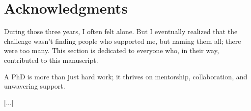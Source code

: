 \chapter*{Acknowledgments}
%


During those three years, I often felt alone.
But I eventually realized that the challenge wasn't finding people who supported me, but naming them all; there were too many.
This section is dedicated to everyone who, in their way, contributed to this manuscript.

A PhD is more than just hard work; it thrives on mentorship, collaboration, and unwavering support.

[...]